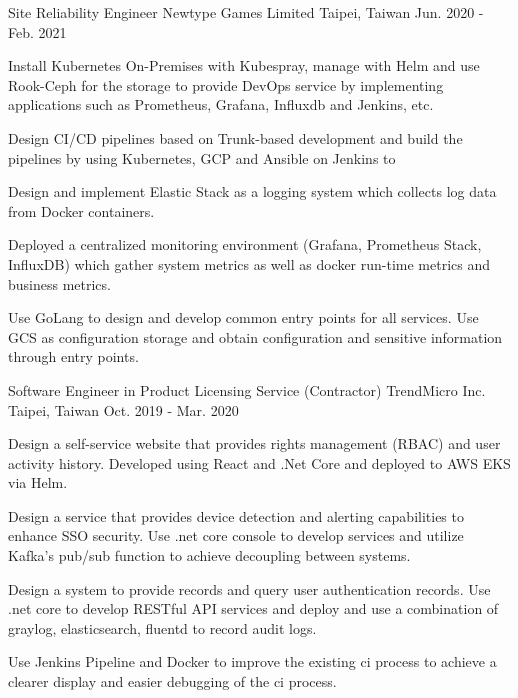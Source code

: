 \begin{cventries}
\cventry
{Site Reliability Engineer} %
{Newtype Games Limited} %
{Taipei, Taiwan} %
{Jun. 2020 - Feb. 2021} %
{
  \begin{cvitems} %
    \item {Install Kubernetes On-Premises with Kubespray, manage with Helm and use Rook-Ceph for the storage to provide DevOps service by implementing applications such as Prometheus, Grafana, Influxdb and Jenkins, etc.}
    \item {Design CI/CD pipelines based on Trunk-based development and build the pipelines by using Kubernetes, GCP and Ansible on Jenkins to }
    \item {Design and implement Elastic Stack as a logging system which collects log data from Docker containers.}
    \item {Deployed a centralized monitoring environment (Grafana, Prometheus Stack, InfluxDB) which gather system metrics as well as docker run-time metrics and business metrics.}
    \item {Use GoLang to design and develop common entry points for all services. Use GCS as configuration storage and obtain configuration and sensitive information through entry points.}
  \end{cvitems}
}

\cventry
{Software Engineer in Product Licensing Service (Contractor)} %
{TrendMicro Inc.} %
{Taipei, Taiwan} %
{Oct. 2019 - Mar. 2020} %
{
  \begin{cvitems} %
    \item {Design a self-service website that provides rights management (RBAC) and user activity history. Developed using React and .Net Core and deployed to AWS EKS via Helm.}
    \item {Design a service that provides device detection and alerting capabilities to enhance SSO security. Use .net core console to develop services and utilize Kafka's pub/sub function to achieve decoupling between systems.}
    \item {Design a system to provide records and query user authentication records. Use .net core to develop RESTful API services and deploy and use a combination of graylog, elasticsearch, fluentd to record audit logs.}
    \item {Use Jenkins Pipeline and Docker to improve the existing ci process to achieve a clearer display and easier debugging of the ci process.}
  \end{cvitems}
}


\end{cventries}
